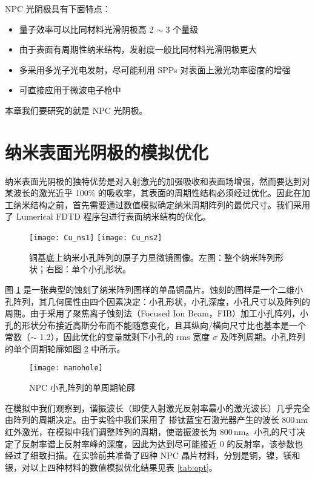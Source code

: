 NPC 光阴极具有下面特点：
\begin{itemize}
	\item 量子效率可以比同材料光滑阴极高 2 $\sim$ 3 个量级
	\item 由于表面有周期性纳米结构，发射度一般比同材料光滑阴极更大
	\item 多采用多光子光电发射，尽可能利用 SPPs 对表面上激光功率密度的增强
	\item 可直接应用于微波电子枪中
\end{itemize}
本章我们要研究的就是 NPC 光阴极。

\section{纳米表面光阴极的模拟优化\label{sec:sim}}
纳米表面光阴极的独特优势是对入射激光的加强吸收和表面场增强，然而要达到对某波长的激光近乎 100\% 的吸收率，其表面的周期性结构必须经过优化。因此在加工纳米结构之前，首先需要通过数值模拟确定纳米周期阵列的最优尺寸。我们采用了 Lumerical FDTD 程序包\cite{Lumerical:aa}进行表面纳米结构的优化。

\begin{figure}[htbp]
\centering
\texttt{[image: Cu\_ns1]}
\texttt{[image: Cu\_ns2]}
\caption{\label{fig:Cu_ns_sem} 
铜基底上纳米小孔阵列的原子力显微镜图像。左图：整个纳米阵列形状；右图：单个小孔形状。}
\end{figure}
图 \ref{fig:Cu_ns_sem} 是一张典型的蚀刻了纳米阵列图样的单晶铜晶片。蚀刻的图样是一个二维小孔阵列，其几何属性由四个因素决定：小孔形状，小孔深度，小孔尺寸以及阵列的周期。由于采用了聚焦离子蚀刻法（Focused Ion Beam，FIB）加工小孔阵列，小孔的形状分布接近高斯分布而不能随意变化，且其纵向/横向尺寸比也基本是一个常数（$\sim$ 1.2），因此优化的变量就剩下小孔的 rms 宽度 $\sigma$ 及阵列周期。小孔阵列的单个周期轮廓如图 \ref{fig:profile} 中所示。

\begin{figure}[htbp]
\begin{center}
\texttt{[image: nanohole]}
\caption{\label{fig:profile} NPC 小孔阵列的单周期轮廓}
\end{center}
\end{figure}

在模拟中我们观察到，谐振波长（即使入射激光反射率最小的激光波长）几乎完全由阵列的周期决定。由于实验中我们采用了 掺钛蓝宝石激光器产生的波长 800\,nm 红外激光，在模拟中我们调整阵列的周期，使谐振波长为 800\,nm。小孔的尺寸决定了反射率谱上反射率峰的深度，因此为达到尽可能接近 0 的反射率，该参数也经过了细致扫描。在实验前共准备了四种 NPC 晶片材料，分别是铜，镍，镁和银，对以上四种材料的数值模拟优化结果见表 \ref{tab:opt}。

